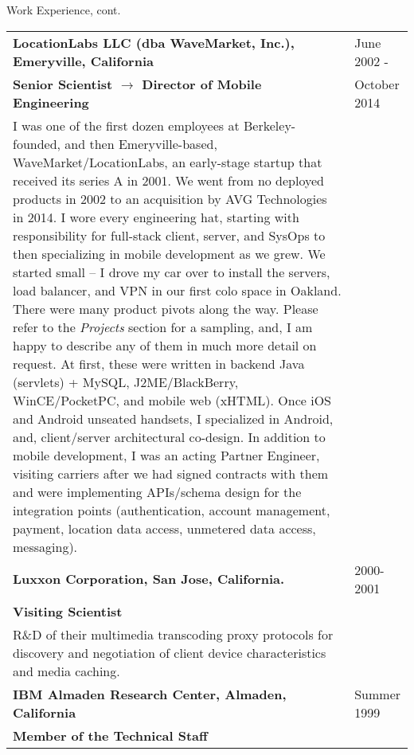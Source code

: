 \newpage
\begin{bf} \large
Work Experience, cont.
\end{bf}
\medskip

\begin{tabular}{p{5.2in}@{\hspace{1.5cm}}l}
	  
	\bf  LocationLabs LLC (dba WaveMarket, Inc.), Emeryville, California    & June 2002 -  \\
	\bf  Senior Scientist $\rightarrow$ Director of Mobile Engineering & October 2014 \\[4pt]
	
	   I was one of the first dozen employees at Berkeley-founded, and then Emeryville-based, 
	   WaveMarket/LocationLabs,
	   an early-stage startup that received its series A in 2001.
	   We went from no deployed products in 2002 to an
	   acquisition by AVG Technologies in 2014.  I wore every engineering hat, starting with responsibility
	   for full-stack client, server, and SysOps to
	   then specializing in mobile development as we grew.  
	   We started small -- 
	   I drove my car over to install the servers, load balancer, and VPN in our first colo space in Oakland.
	   There were many product pivots along the way. Please refer to the {\it Projects} section for a sampling, 
	   and, I am happy to describe any of them in much more detail on request.
	   At first, these were written in backend Java (servlets) + MySQL, J2ME/BlackBerry, WinCE/PocketPC,
	   and mobile web (xHTML).
	   Once iOS and Android unseated handsets, 
	   I specialized in Android, and, client/server architectural co-design.  In addition to mobile development, I was an acting
	   Partner Engineer, visiting carriers after we had signed contracts
	   with them and were implementing APIs/schema design for the integration points
	    (authentication, account management, payment, location data access, unmetered data access, messaging). \\[9pt]
       	  
    \bf Luxxon Corporation, San Jose, California. & 2000-2001 \\
    \bf Visiting Scientist  \\[4pt]

       R\&D of their multimedia transcoding proxy
       protocols for discovery and negotiation of client
       device characteristics and media caching. \\[9pt]

    \bf IBM Almaden Research Center, 
          Almaden, California                         & Summer 1999 \\
    \bf Member of the Technical Staff \\[4pt]


\end{tabular}
